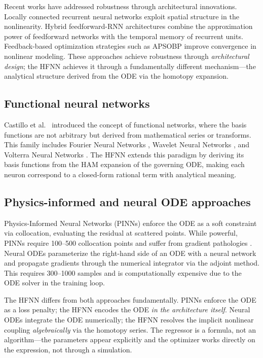\documentclass[preprint,12pt]{elsarticle}
\begin{document}
Recent works have addressed robustness through architectural innovations. Locally connected recurrent neural networks \cite{reviewer3_ref1} exploit spatial structure in the nonlinearity. Hybrid feedforward-RNN architectures \cite{reviewer3_ref2} combine the approximation power of feedforward networks with the temporal memory of recurrent units. Feedback-based optimization strategies such as APSOBP \cite{reviewer3_ref3} improve convergence in nonlinear modeling. These approaches achieve robustness through \emph{architectural design}; the HFNN achieves it through a fundamentally different mechanism---the analytical structure derived from the ODE via the homotopy expansion.

\subsection{Functional neural networks}
Castillo et al.\ \cite{castillo1998} introduced the concept of functional networks, where the basis functions are not arbitrary but derived from mathematical series or transforms. This family includes Fourier Neural Networks \cite{zuo2008}, Wavelet Neural Networks \cite{jamal2014}, and Volterra Neural Networks \cite{liu1998volterra}. The HFNN extends this paradigm by deriving its basis functions from the HAM expansion of the governing ODE, making each neuron correspond to a closed-form rational term with analytical meaning.

\subsection{Physics-informed and neural ODE approaches}
Physics-Informed Neural Networks (PINNs) \cite{raissi2019} enforce the ODE as a soft constraint via collocation, evaluating the residual at scattered points. While powerful, PINNs require 100--500 collocation points and suffer from gradient pathologies \cite{wang2021}. Neural ODEs \cite{chen2018} parameterize the right-hand side of an ODE with a neural network and propagate gradients through the numerical integrator via the adjoint method. This requires 300--1000 samples and is computationally expensive due to the ODE solver in the training loop.

The HFNN differs from both approaches fundamentally. PINNs enforce the ODE as a loss penalty; the HFNN encodes the ODE \emph{in the architecture itself}. Neural ODEs integrate the ODE numerically; the HFNN resolves the implicit nonlinear coupling \emph{algebraically} via the homotopy series. The regressor is a formula, not an algorithm---the parameters appear explicitly and the optimizer works directly on the expression, not through a simulation.
\end{document}
